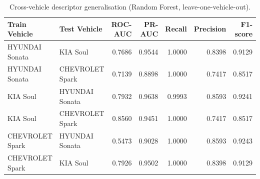 \begin{table}[t]
\centering
\begin{tabular}{llrrrrr}
\toprule
Train Vehicle & Test Vehicle & ROC-AUC & PR-AUC & Recall & Precision & F1-score \\
\midrule
HYUNDAI Sonata & KIA Soul & 0.7686 & 0.9544 & 1.0000 & 0.8398 & 0.9129 \\
HYUNDAI Sonata & CHEVROLET Spark & 0.7139 & 0.8898 & 1.0000 & 0.7417 & 0.8517 \\
KIA Soul & HYUNDAI Sonata & 0.7932 & 0.9638 & 0.9993 & 0.8593 & 0.9241 \\
KIA Soul & CHEVROLET Spark & 0.8560 & 0.9451 & 1.0000 & 0.7417 & 0.8517 \\
CHEVROLET Spark & HYUNDAI Sonata & 0.5473 & 0.9028 & 1.0000 & 0.8593 & 0.9243 \\
CHEVROLET Spark & KIA Soul & 0.7926 & 0.9502 & 1.0000 & 0.8398 & 0.9129 \\
\bottomrule
\end{tabular}
\caption{Cross-vehicle descriptor generalisation (Random Forest, leave-one-vehicle-out).}
\label{tab:cross-vehicle-generalisation}
\end{table}
